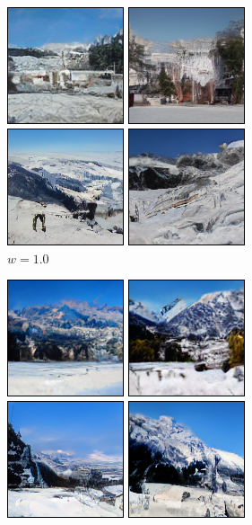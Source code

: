\documentclass[11pt,a4paper]{article}
\begin{document}
\begin{figure}[!ht]
\centering
\begin{subfigure}[b]{0.24\textwidth}
\includegraphics[width=\linewidth]{figures/a_beautiful_snowy_mountain_landscape_1.png}
\caption{$w=1.0$}
\end{subfigure}
\begin{subfigure}[b]{0.24\textwidth}
\includegraphics[width=\linewidth]{figures/a_beautiful_snowy_mountain_landscape_3.png}

\end{subfigure}
\end{figure}
\end{document}
